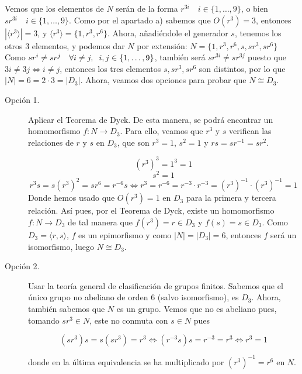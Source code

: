 \documentclass[12pt]{article}
\begin{document}
\begin{ejercicio}[3 puntos]
\begin{enumerate}[label=(\alph*)]
            Vemos que los elementos de $N$ serán de la forma $r^{3i} \quad i \in \{1, \ldots, 9\}$, o bien $sr^{3i} \quad i \in \{1, \ldots, 9\}$. Como por el apartado a) sabemos que $O(r^3) = 3$, entonces $|\langle r^3 \rangle| = 3$, y $\langle r^3 \rangle = \{1, r^3, r^6\}$. Ahora, añadiéndole
            el generador $s$, tenemos los otros $3$ elementos, y podemos dar $N$ por extensión: $N = \{1, r^3, r^6, s, sr^3, sr^6\}$ Como $sr^{i} \neq sr^j \quad \forall i\neq j, \hspace{0.2cm} i,j \in \{1, \ldots, 9\}$, también será $sr^{3i} \neq sr^{3j}$ puesto que $3i \neq 3j \iff i \neq j$, 
            entonces los tres elementos $s, sr^3, sr^6$ son distintos, por lo que $|N| = 6 = 2 \cdot 3 = |D_3|$. Ahora, veamos dos opciones para probar que $N \cong D_3$. \\

            \begin{description}
                \item[Opción 1.] 
                
                Aplicar el Teorema de Dyck. De esta manera, se podrá encontrar un homomorfismo $f : N \to D_3$. Para ello, veamos que $r^3$ y $s$ verifican las relaciones de $r$ y $s$ en $D_3$, que son $r^3 = 1$, $s^2 = 1$ y $rs = sr^{-1} = sr^2$.

                $$(r^3)^3 = 1^3 = 1$$
                $$s^2 = 1$$
                $$r^3s = s(r^3)^2 = sr^6 = r^{-6}s \iff r^3 = r^{-6} = r^{-3} \cdot r^{-3} = (r^{3})^{-1} \cdot (r^{3})^{-1} = 1$$
                Donde hemos usado que $O(r^3) = 1$ en $D_3$ para la primera y tercera relación. Así pues, por el Teorema de Dyck, existe un homomorfismo $f : N \to D_3$ de tal manera que $f(r^3) = r \in D_3$ y $f(s) = s \in D_3$. Como $D_3 = \langle r,s \rangle$, $f$ es un epimorfismo y como
                $|N| = |D_3| = 6$, entonces $f$ será un isomorfismo, luego $N \cong D_3$. \\

                \item[Opción 2.] Usar la teoría general de clasificación de grupos finitos. Sabemos que el único grupo no abeliano de orden $6$ (salvo isomorfismo), es $D_3$. Ahora, también sabemos que $N$ es un grupo. Vemos que no es abeliano pues, tomando $sr^3 \in N$, este no conmuta con $s \in N$ pues
                
                $$(sr^3)s = s(sr^3) = r^3 \iff (r^{-3}s)s = r^{-3} = r^{3} \iff r^{3} = 1$$

                donde en la última equivalencia se ha multiplicado por $(r^{3})^{-1} = r^{6}$ en $N$.


\end{description}
\end{enumerate}
\end{ejercicio}
\end{document}
